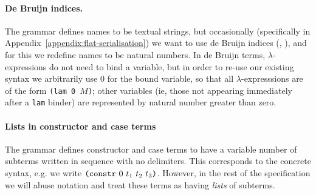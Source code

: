 
\paragraph{De Bruijn indices.}
The grammar defines names to be textual strings, but occasionally (specifically
in Appendix~\ref{appendix:flat-serialisation}) we want to use de Bruijn indices
(\cite{deBruijn}, \cite[C.3]{Barendregt}), and for this we redefine names to be
natural numbers.  In de Bruijn terms, $\lambda$-expressions do not need to bind
a variable, but in order to re-use our existing syntax we arbitrarily use 0 for
the bound variable, so that all $\lambda$-expresssions are of the form
\texttt{(lam 0 $M$)}; other variables (ie, those not appearing immediately after
a \texttt{lam} binder) are represented by natural number greater than zero.

\paragraph{Lists in constructor and case terms}
The grammar defines constructor and case terms to have a variable number of
subterms written in sequence with no delimiters. This corresponds to the
concrete syntax, e.g. we write $\texttt{(} \texttt{constr} ~ 0 ~ t_1\ t_2\ t_3 \texttt{)}$. However, in the
rest of the specification we will abuse notation and treat these terms as
having \emph{lists} of subterms.
